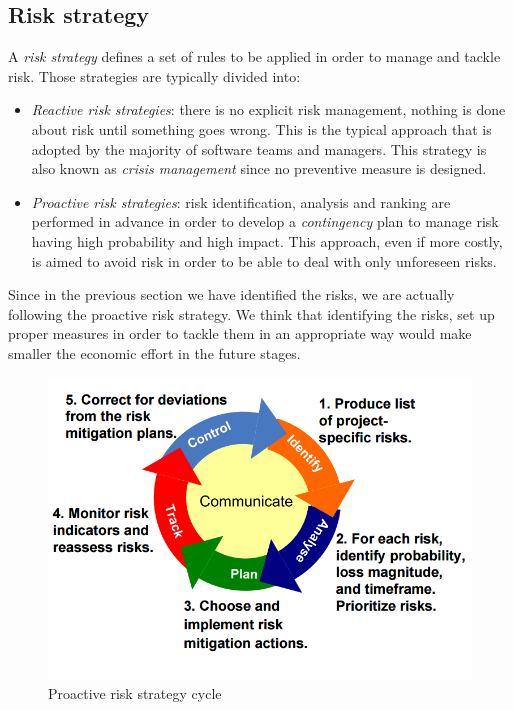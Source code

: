 \subsection{Risk strategy}

A \emph{risk strategy} defines a set of rules to be applied in order
to manage and tackle risk. Those strategies are typically divided
into:
\begin{itemize}
\item \emph{Reactive risk strategies}: there is no explicit risk management,
nothing is done about risk until something goes wrong. This is the
typical approach that is adopted by the majority of software teams
and managers. This strategy is also known as \emph{crisis management}
since no preventive measure is designed.
\item \emph{Proactive risk strategies}: risk identification, analysis and
ranking are performed in advance in order to develop a \emph{contingency}
plan to manage risk having high probability and high impact. This
approach, even if more costly, is aimed to avoid risk in order to
be able to deal with only unforeseen risks.
\end{itemize}
Since in the previous section we have identified the risks, we are
actually following the proactive risk strategy. We think that identifying
the risks, set up proper measures in order to tackle them in an appropriate
way would make smaller the economic effort in the future stages.

\begin{figure}[H]
\noindent \begin{centering}
\includegraphics[scale=0.75]{risks/images/risk}
\par\end{centering}

\protect\caption{Proactive risk strategy cycle}
\end{figure}


